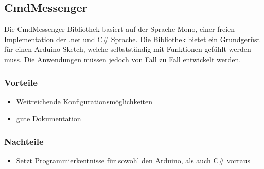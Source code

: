 \subsection {CmdMessenger}
Die CmdMessenger Bibliothek basiert auf der Sprache Mono, einer freien 
Implementation der .net und C\# Sprache. Die Bibliothek bietet ein Grundgerüst 
für einen Arduino-Sketch, welche selbstständig mit Funktionen gefühlt werden 
muss. Die Anwendungen müssen jedoch von Fall zu Fall entwickelt werden.
\subsubsection{Vorteile}
\begin{itemize}
 \item Weitreichende Konfigurationsmöglichkeiten
 \item gute Dokumentation
\end{itemize}

\subsubsection{Nachteile}
\begin{itemize}
 \item Setzt Programmierkentnisse für sowohl den Arduino, als auch C\# vorraus
\end{itemize}

